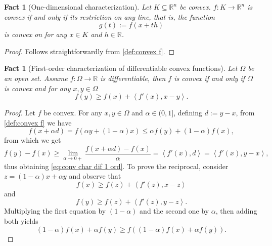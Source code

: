 \documentclass[smallextended,numbook,nospthms]{svjour3}
\theoremstyle{plain}
\newtheorem{fact}[theorem]{Fact}
\theoremstyle{definition}
\def\RR{\mathds R}
\newcommand{\scal}[2]{\left\langle{#1},{#2}  \right\rangle}
\begin{document}
\begin{fact}[One-dimensional characterization]\label{fact:conv 1 dim char}
	Let $K \subseteq \RR^n$ be convex. $f:K \rightarrow \RR^n$ is convex if and only if its restriction on any line, that is, the function
	$$
	g(t):=f(x+th)
	$$
	is convex on for any $x \in K$ and $h \in \RR$.
\end{fact} 
\begin{proof}
	Follows straightforwardly from \cref{def:convex f}.
\end{proof}

\begin{fact}[First-order characterization of differentiable convex functions]\label{fact:conv char dif 1 ord}
	Let $\Omega$ be an open set. Assume $f:\Omega\rightarrow \RR$ is differentiable, then $f$ is convex if and only if $\Omega$ is convex and for any $x, y \in \Omega$
	$$
	f(y) \geq f(x)+\scal{f'(x)}{x-y}. \label{eq:conv char dif 1 ord}
	$$
\end{fact}
\begin{proof}
Let $f$ be convex. For any $x, y \in \Omega$ and $\alpha \in (0,1]$, defining $d:=y-x$, from \cref{def:convex f} we have
\[
f(x + \alpha d)=f(\alpha y + (1-\alpha)x) \leq \alpha f(y) + (1-\alpha)f(x),
\]
from which we get
\[
f(y)-f(x) \geq \lim_{\alpha \rightarrow 0+} \frac{f(x+\alpha d)-f(x)}{\alpha}=\scal{f'(x)}{d}=\scal{f'(x)}{y-x},
\]
thus obtaining \cref{eq:conv char dif 1 ord}.
To prove the reciprocal, consider $z=(1-\alpha)x+\alpha y$ and observe that
\[
f(x) \geq f(z) + \scal{f'(z)}{x-z}
\]
and
\[
f(y) \geq f(z) + \scal{f'(z)}{y-z}.
\]
Multiplying the first equation by $(1-\alpha)$ and the second one by $\alpha$, then adding both yields
\[
(1-\alpha)f(x)+\alpha f(y) \geq f\left((1-\alpha)f(x) + \alpha f(y)\right).
\]
\end{proof}
\end{document}
